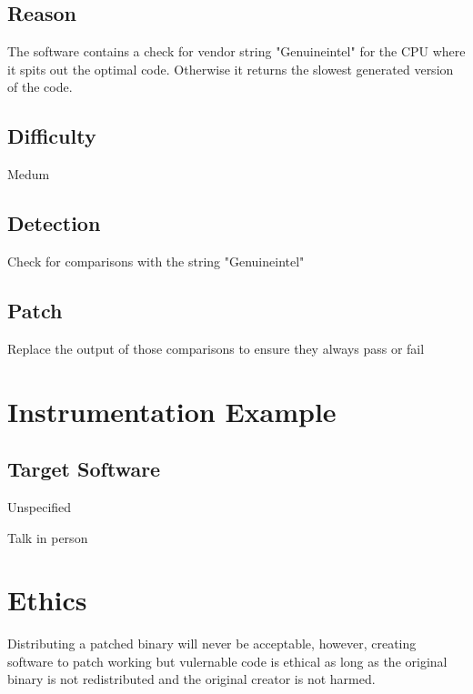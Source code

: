 \subsection{Reason}
The software contains a check for vendor string "Genuineintel" for the CPU where it spits out the optimal code. Otherwise it returns the slowest generated version of the code.
\subsection{Difficulty}
Medum
\subsection{Detection}
Check for comparisons with the string "Genuineintel"
\subsection{Patch}
Replace the output of those comparisons to ensure they always pass or fail

\section{Instrumentation Example}
\subsection{Target Software}
Unspecified

Talk in person

\section{Ethics}
Distributing a patched binary will never be acceptable, however, creating software to patch working but vulernable code is ethical as long as the original binary is not redistributed and the original creator is not harmed. 








